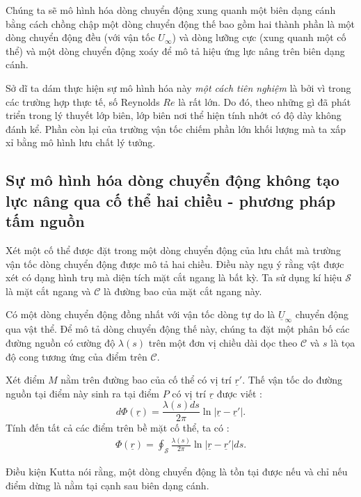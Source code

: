 \documentclass[KHI_DONG_HOC.tex]{subfiles}
\begin{document}
Chúng ta sẽ mô hình hóa dòng chuyển động xung quanh một biên dạng cánh bằng cách chồng chập một dòng chuyển động thế bao gồm hai thành phần là một dòng chuyển động đều (với vận tốc $U_\infty$) và dòng lưỡng cực (xung quanh một cố thể) và một dòng chuyển động xoáy để mô tả hiệu ứng lực nâng trên biên dạng cánh.

Sở dĩ ta dám thực hiện sự mô hình hóa này \emph{một cách tiên nghiệm} là bởi vì trong các trường hợp thực tế, số Reynolds $Re$ là rất lớn. Do đó, theo những gì đã phát triển trong lý thuyết lớp biên, lớp biên nơi thể hiện tính nhớt có độ dày không đánh kể. Phần còn lại của trường vận tốc chiếm phần lớn khối lượng mà ta xấp xỉ bằng mô hình lưu chất lý tưởng.

\subsection{Sự mô hình hóa dòng chuyển động không tạo lực nâng qua cố thể hai chiều - phương pháp tấm nguồn}

Xét một cố thể được đặt trong một dòng chuyển động của lưu chất mà trường vận tốc dòng chuyển động được mô tả hai chiều. Điều này ngụ ý rằng vật được xét có dạng hình trụ mà diện tích mặt cắt ngang là bất kỳ. Ta sử dụng kí hiệu $\mathcal{S}$ là mặt cắt ngang và $\mathcal{C}$ là đường bao của mặt cắt ngang này.

Có một dòng chuyển động đồng nhất với vận tốc dòng tự do là $\underline{U}_\infty$ chuyển động qua vật thể. Để mô tả dòng chuyển động thế này, chúng ta đặt một phân bố các đường nguồn có cường độ $\lambda(s)$ trên một đơn vị chiều dài dọc theo $\mathcal{C}$ và $s$ là tọa độ cong tương ứng của điểm trên $\mathcal{C}$.

Xét điểm $M$ nằm trên đường bao của cố thể có vị trí $\underline{r}'$. Thế vận tốc do đường nguồn tại điểm này sinh ra tại điểm $P$ có vị trí $\underline{r}$ được viết :
\[
d\Phi(\underline{r})=\frac{\lambda(s)ds}{2\pi}\ln|\underline{r}-\underline{r}'|.
\]
Tính đến tất cả các điểm trên bề mặt cố thể, ta có :
\begin{equation}
	\begin{aligned}
		\Phi(\underline{r})=\oint_\mathcal{S} \frac{\lambda(s)}{2\pi}\ln|\underline{r}-\underline{r}'|ds.
	\end{aligned}
\end{equation}

	Điều kiện Kutta nói rằng, một dòng chuyển động là tồn tại được nếu và chỉ nếu điểm dừng là nằm tại cạnh sau biên dạng cánh.
\end{document}
